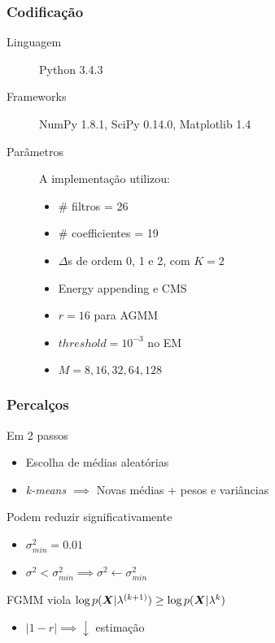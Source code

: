 \begin{frame}
\frametitle{Codificação}
\begin{description}
    \item[Linguagem] Python 3.4.3
    \pause
    \item[Frameworks] NumPy 1.8.1, SciPy 0.14.0, Matplotlib 1.4
    \pause
    \item[Parâmetros] A implementação utilizou:
    \pause
    \begin{itemize}
        \item \# filtros = 26
        \item \# coefficientes = 19
        \item $\Delta$s de ordem 0, 1 e 2, com $K = 2$
        \item Energy appending e CMS
        \item $r = 16$ para AGMM
        \item $threshold = 10^{-3}$ no EM
        \item $M = 8, 16, 32, 64, 128$
    \end{itemize}
\end{description}
\end{frame}

\begin{frame}
\frametitle{Percalços}
\begin{description}\itemsep6pt
    \item[Inicialização] Em 2 passos
    \pause
    \begin{itemize}
        \item Escolha de médias aleatórias
        \item \emph{k-means} $\implies$ Novas médias + pesos e variâncias
        \pause
    \end{itemize}
    \item[Variâncias] Podem reduzir significativamente
    \pause
    \begin{itemize}\itemsep4pt
        \item $\sigma_{min}^2 = 0.01$
        \item $\sigma^2 < \sigma_{min}^2 \implies \sigma^2 \gets \sigma_{min}^2$
        \pause
    \end{itemize}
    \item[$\overline{Monotonic}$] FGMM viola $\log p(\boldsymbol{X}|\lambda^{(k+1)}) \geq \log p(\boldsymbol{X}|\lambda^{k})$
    \pause
    \begin{itemize}\itemsep4pt
        \item $|1 - r| \implies \downarrow$ estimação
    \end{itemize}
\end{description}
\end{frame}

